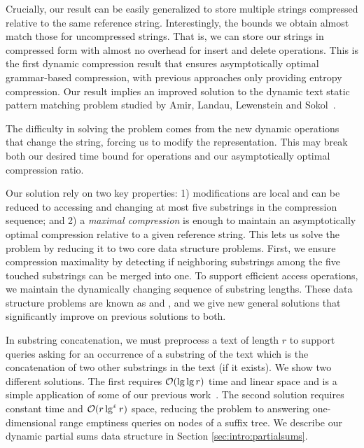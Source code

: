 Crucially, our result can be easily generalized to store multiple strings compressed relative to the same reference string. 
Interestingly, the bounds we obtain almost match those for uncompressed strings. That is, we can store our strings in compressed form with almost no overhead for insert and delete operations. This is the first dynamic compression result that ensures asymptotically optimal grammar-based compression, with previous approaches only providing entropy compression. Our result implies an improved solution to the dynamic text static pattern matching problem studied by Amir, Landau, Lewenstein and Sokol~\cite{amir2007dynamic}.

The difficulty in solving the problem comes from the new dynamic operations that change the string, forcing us to modify the representation. This may break both our desired time bound for operations and our asymptotically optimal compression ratio. 

Our solution rely on two key properties: 1) modifications are local and can be reduced to accessing and changing at most five substrings in the compression sequence; and 2) a \emph{maximal compression} is enough to maintain an asymptotically optimal compression relative to a given reference string.
This lets us solve the problem by reducing it to two core data structure problems. 
First, we ensure compression maximality by detecting if neighboring substrings among the five touched substrings can be merged into one. To support efficient access operations, we maintain the dynamically changing sequence of substring lengths. These data structure problems are known as  and , and we give new general solutions that significantly improve on previous solutions to both. 

In substring concatenation, we must preprocess a text of length $r$ to support queries asking for an occurrence of a substring of the text which is the concatenation of two other substrings in the text (if it exists). We show two different solutions. The first requires $\mathcal{O}(\lg \lg r)$ time and linear space and is a simple application of some of our previous work~\cite{bille2014string}. The second solution requires constant time and $\mathcal{O}(r \lg^\upvarepsilon r)$ space, reducing the problem to answering one-dimensional range emptiness queries on nodes of a suffix tree. We describe our dynamic partial sums data structure in Section \ref{sec:intro:partialsums}.

